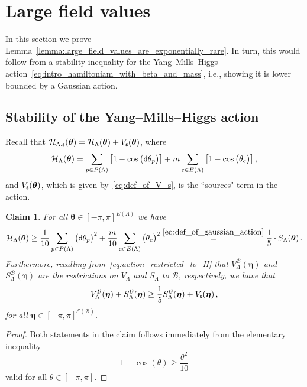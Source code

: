 \documentclass[11pt]{article}
\newtheorem{claim}[theorem]{Claim}
\theoremstyle{definition}
\theoremstyle{remark}
\numberwithin{theorem}{section}
\def\La{{\Lambda}}
\newcommand{\cE}{\mathcal{E}}
\newcommand{\cB}{\mathcal B}
\begin{document}
    \section{Large field values}
    \label{sec:large_field_values}
  
    In this section we prove Lemma~\ref{lemma:large_field_values_are_exponentially_rare}. In turn, this would follow from a stability inequality for the Yang--Mills--Higgs action~\eqref{eq:intro_hamiltoniam_with_beta_and_mass}, i.e., showing it is lower bounded by a Gaussian action. 
    \subsection{Stability of the Yang--Mills--Higgs action}
    Recall that $\mathcal{H}_{\La,{\sf s}}(\boldsymbol{\theta}) = \mathcal{H}_{\La}(\boldsymbol{\theta}) + V_{\sf s}(\boldsymbol{\theta})$, where 
    \[
    \mathcal{H}_{\La}(\boldsymbol{\theta}) = \sum_{p\in P(\Lambda)} \big[1 - \cos\big({\sf d} \theta_p\big)\big] + m \sum_{e\in E(\Lambda)} \big[1- \cos\big(\theta_e\big)\big] \, ,
    \]
    and $V_{\sf s}(\boldsymbol{\theta})$, which is given by~\eqref{eq:def_of_V_s}, is the ``sources" term in the action. 
    \begin{claim}\label{claim:YMH_action_is_stable}
        For all $\boldsymbol{\theta} \in [-\pi,\pi]^{E(\La)}$ we have 
        \[
        \mathcal{H}_{\La}(\boldsymbol{\theta}) \ge \frac{1}{10}\sum_{p\in P(\Lambda)} \big({\sf d} \theta_p\big)^2 + \frac{m}{10} \sum_{e\in E(\Lambda)} \big(\theta_e\big)^2 \stackrel{\eqref{eq:def_of_gaussian_action}}{=} \frac{1}{5} \cdot S_{\La}(\boldsymbol{\theta}) \, . 
        \]
        Furthermore, recalling from~\eqref{eq:action_restricted_to_H} that $V_{\Lambda}^{\mathcal{B}}(\boldsymbol{\eta})$ and $S_{\Lambda}^{\mathcal{B}}(\boldsymbol{\eta})$ are the restrictions on $V_{\Lambda}$ and $S_{\Lambda}$ to $\cB$, respectively, we have that 
        \[
        V_{\Lambda}^{\mathcal{B}}(\boldsymbol{\eta}) + S_{\Lambda}^{\mathcal{B}}(\boldsymbol{\eta}) \ge \frac{1}{5} S_{\Lambda}^{\mathcal{B}}(\boldsymbol{\eta}) + V_{\sf s}(\boldsymbol{\eta}) \, ,
        \]
        for all $\boldsymbol{\eta} \in [-\pi,\pi]^{\cE(\cB)}$. 
    \end{claim}
    \begin{proof}
        Both statements in the claim follows immediately from the elementary inequality
        \[
        1- \cos(\theta) \ge \frac{\theta^2}{10}
        \]
        valid for all $\theta\in[-\pi,\pi]$. 
    \end{proof}
\end{document}
